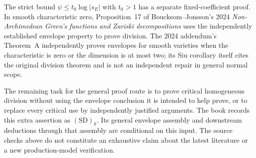 \documentclass[11pt,a4paper]{article}
\theoremstyle{definition}
\theoremstyle{remark}
\begin{document}
The strict bound $\psi\leq t_0\log|s_E|$ with $t_0>1$ has a separate
fixed-coefficient proof. In smooth characteristic zero, Proposition~17
of Boucksom--Jonsson's 2024 \emph{Non-Archimedean Green's functions and
Zariski decompositions} uses the independently established envelope property
to prove division. The 2024 addendum's Theorem~A independently proves
envelopes for smooth varieties when the characteristic is zero or the
dimension is at most two; its Siu corollary itself cites the original
division theorem and is not an independent repair in general normal scope.

The remaining task for the general proof route is to prove critical
homogeneous division without using the envelope conclusion it is intended
to help prove, or to replace every critical use by independently justified
arguments. The book records this extra assertion as $\mathrm{(SD)}_k$.
Its general envelope assembly and downstream deductions through that
assembly are conditional on this input. The source checks above do not
constitute an exhaustive claim about the latest literature or a new
production-model verification.
\end{document}
